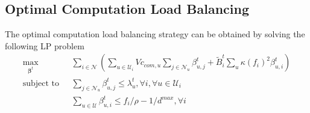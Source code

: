 \documentclass[12pt, draftclsnofoot, letterpaper, onecolumn]{IEEEtran}
\begin{document}
\subsection{Optimal Computation Load Balancing}
The optimal computation load balancing strategy can be obtained by solving the following LP problem
\begin{subequations}
	\begin{align}
	\max_{\bm\beta^t} &~~~\sum_{i\in\mathcal{N}} \left( \sum_{u\in\mathcal{U}_i}Vc_{com,u}\sum_{j\in\mathcal{N}_u}\beta^t_{u,j} + \tilde{B}^t_{i}\sum_{u} \kappa(f_i)^2\beta^t_{u,i}\right) \label{CLB}\\
	\text{subject to}&~~~\sum_{j\in\mathcal{N}_u}\beta^t_{u,j} \leq \lambda^t_{u}, \forall i, \forall u\in\mathcal{U}_i\\
	&~~~\sum_{u\in\mathcal{U}}\beta^t_{u,i} \leq f_i/\rho - 1/d^{max}, \forall i  \label{decoupled constraints}
	\end{align}
\end{subequations}
\end{document}
